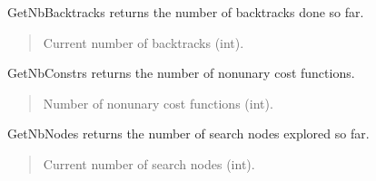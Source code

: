 \documentclass[letterpaper,10pt,openany,oneside,english]{sphinxmanual}
\begin{document}
\begin{fulllineitems}
\begin{fulllineitems}
\begin{quote}
\begin{description}
\end{description}\end{quote}

\end{fulllineitems}


\begin{fulllineitems}
\label{\detokenize{ref/ref_python:pytoulbar2.CFN.GetNbBacktracks}}
\pysigstartsignatures
{}
\pysigstopsignatures
\sphinxAtStartPar
GetNbBacktracks returns the number of backtracks done so far.
\begin{quote}\begin{description}
\sphinxAtStartPar
Current number of backtracks (int).

\end{description}\end{quote}

\end{fulllineitems}


\begin{fulllineitems}
\label{\detokenize{ref/ref_python:pytoulbar2.CFN.GetNbConstrs}}
\pysigstartsignatures
{}
\pysigstopsignatures
\sphinxAtStartPar
GetNbConstrs returns the number of non\sphinxhyphen{}unary cost functions.
\begin{quote}\begin{description}
\sphinxAtStartPar
Number of non\sphinxhyphen{}unary cost functions (int).

\end{description}\end{quote}

\end{fulllineitems}


\begin{fulllineitems}
\label{\detokenize{ref/ref_python:pytoulbar2.CFN.GetNbNodes}}
\pysigstartsignatures
{}
\pysigstopsignatures
\sphinxAtStartPar
GetNbNodes returns the number of search nodes explored so far.
\begin{quote}\begin{description}
\sphinxAtStartPar
Current number of search nodes (int).


\end{description}
\end{quote}
\end{fulllineitems}
\end{fulllineitems}
\end{document}
